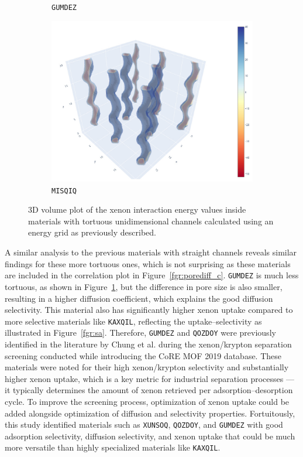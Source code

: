 \documentclass[main]{subfiles}
\begin{document}
\begin{figure}[ht]
\begin{subfigure}[b]{0.32\textwidth}
      \caption{\texttt{GUMDEZ}~\cite{Yin_2014}}\label{fgr:zigzag_b}
  \end{subfigure}
  \hfill
  \begin{subfigure}[b]{0.32\textwidth}
      \centering
      \includegraphics[width=\textwidth]{figures/5-diffusion/viz/MISQIQ.jpg}
      \caption{\texttt{MISQIQ}~\cite{Tong_2013}}\label{fgr:zigzag_c}
  \end{subfigure}
     \caption{ 3D volume plot of the xenon interaction energy values inside materials with tortuous unidimensional channels calculated using an energy grid as previously described.}\label{fgr:zigzag}
\end{figure}

A similar analysis to the previous materials with straight channels reveals similar findings for these more tortuous ones, which is not surprising as these materials are included in the correlation plot in Figure~\ref{fgr:porediff_c}. \texttt{GUMDEZ} is much less tortuous, as shown in Figure~\ref{fgr:zigzag_b}, but the difference in pore size is also smaller, resulting in a higher diffusion coefficient, which explains the good diffusion selectivity. This material also has significantly higher xenon uptake compared to more selective materials like \texttt{KAXQIL}, reflecting the uptake--selectivity as illustrated in Figure~\ref{fgr:sa}. Therefore, \texttt{GUMDEZ} and \texttt{QOZDOY} were previously identified in the literature by Chung et al.\autocite{Chung_2019} during the xenon/krypton separation screening conducted while introducing the CoRE MOF 2019 database. These materials were noted for their high xenon/krypton selectivity and substantially higher xenon uptake, which is a key metric for industrial separation processes --- it typically determines the amount of xenon retrieved per adsorption--desorption cycle. To improve the screening process, optimization of xenon uptake could be added alongside optimization of diffusion and selectivity properties. Fortuitously, this study identified materials such as \texttt{XUNSOQ}, \texttt{QOZDOY}, and \texttt{GUMDEZ} with good adsorption selectivity, diffusion selectivity, and xenon uptake that could be much more versatile than highly specialized materials like \texttt{KAXQIL}.
\end{document}
